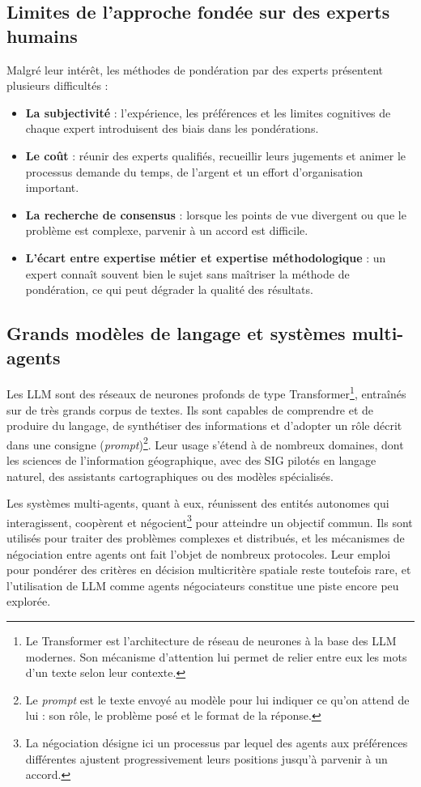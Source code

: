 \documentclass[11pt,a4paper]{article}
\begin{document}
\subsection{Limites de l'approche fondée sur des experts humains}

Malgré leur intérêt, les méthodes de pondération par des experts présentent plusieurs difficultés :
\begin{itemize}
  \item \textbf{La subjectivité} : l'expérience, les préférences et les limites cognitives de chaque expert introduisent des biais dans les pondérations.
  \item \textbf{Le coût} : réunir des experts qualifiés, recueillir leurs jugements et animer le processus demande du temps, de l'argent et un effort d'organisation important.
  \item \textbf{La recherche de consensus} : lorsque les points de vue divergent ou que le problème est complexe, parvenir à un accord est difficile.
  \item \textbf{L'écart entre expertise métier et expertise méthodologique} : un expert connaît souvent bien le sujet sans maîtriser la méthode de pondération, ce qui peut dégrader la qualité des résultats.
\end{itemize}

\subsection{Grands modèles de langage et systèmes multi-agents}

Les LLM sont des réseaux de neurones profonds de type Transformer\footnote{Le Transformer est l'architecture de réseau de neurones à la base des LLM modernes. Son mécanisme d'attention lui permet de relier entre eux les mots d'un texte selon leur contexte.}, entraînés sur de très grands corpus de textes. Ils sont capables de comprendre et de produire du langage, de synthétiser des informations et d'adopter un rôle décrit dans une consigne (\emph{prompt})\footnote{Le \emph{prompt} est le texte envoyé au modèle pour lui indiquer ce qu'on attend de lui : son rôle, le problème posé et le format de la réponse.}. Leur usage s'étend à de nombreux domaines, dont les sciences de l'information géographique, avec des SIG pilotés en langage naturel, des assistants cartographiques ou des modèles spécialisés.

Les systèmes multi-agents, quant à eux, réunissent des entités autonomes qui interagissent, coopèrent et négocient\footnote{La négociation désigne ici un processus par lequel des agents aux préférences différentes ajustent progressivement leurs positions jusqu'à parvenir à un accord.} pour atteindre un objectif commun. Ils sont utilisés pour traiter des problèmes complexes et distribués, et les mécanismes de négociation entre agents ont fait l'objet de nombreux protocoles. Leur emploi pour pondérer des critères en décision multicritère spatiale reste toutefois rare, et l'utilisation de LLM comme agents négociateurs constitue une piste encore peu explorée.
\end{document}
